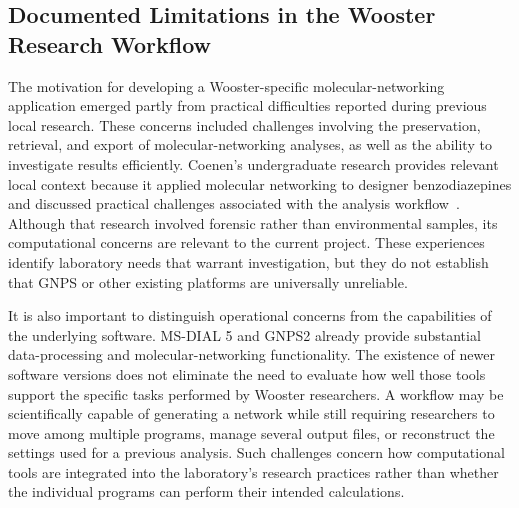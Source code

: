     \subsection{Documented Limitations in the Wooster Research Workflow}\label{subsec:workflow-limitations}


        The motivation for developing a Wooster-specific molecular-networking application emerged partly from practical difficulties reported during previous local research. These concerns included challenges involving the preservation, retrieval, and export of molecular-networking analyses, as well as the ability to investigate results efficiently. Coenen's undergraduate research provides relevant local context because it applied molecular networking to designer benzodiazepines and discussed practical challenges associated with the analysis workflow~\cite{Coenen2026}. Although that research involved forensic rather than environmental samples, its computational concerns are relevant to the current project. These experiences identify laboratory needs that warrant investigation, but they do not establish that GNPS or other existing platforms are universally unreliable.

        It is also important to distinguish operational concerns from the capabilities of the underlying software. MS-DIAL 5 and GNPS2 already provide substantial data-processing and molecular-networking functionality. The existence of newer software versions does not eliminate the need to evaluate how well those tools support the specific tasks performed by Wooster researchers. A workflow may be scientifically capable of generating a network while still requiring researchers to move among multiple programs, manage several output files, or reconstruct the settings used for a previous analysis. Such challenges concern how computational tools are integrated into the laboratory's research practices rather than whether the individual programs can perform their intended calculations.

